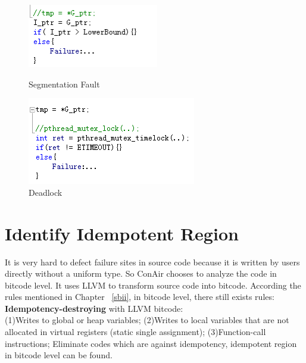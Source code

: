 \begin{figure}
\begin{minipage}[t]{0.52\linewidth}
\centering
\includegraphics[width=\textwidth]{body/segmentation_fault.png}
\caption{Segmentation Fault}
\label {SF}
\end{minipage}%
\begin{minipage}[t]{0.52\linewidth}
\centering
\includegraphics[width=\textwidth]{body/deadlock_failure.png}
\caption{Deadlock}
\label{DL}
\end{minipage}
\end{figure}

\section{Identify Idempotent Region}
It is very hard to defect failure sites in source code because it is written by users directly without a uniform type. So ConAir chooses to analyze the code in bitcode level. It uses LLVM to transform source code into bitcode. According the rules mentioned in Chapter ~\ref{sbii}, in bitcode level, there still exists rules:\\
\textbf{Idempotency-destroying} with LLVM bitcode:\\
(1)Writes to global or heap variables;
(2)Writes to local variables that are not allocated in virtual registers (static single assignment);
(3)Function-call instructions;
Eliminate codes which are against idempotency, idempotent region in bitcode level can be found.
